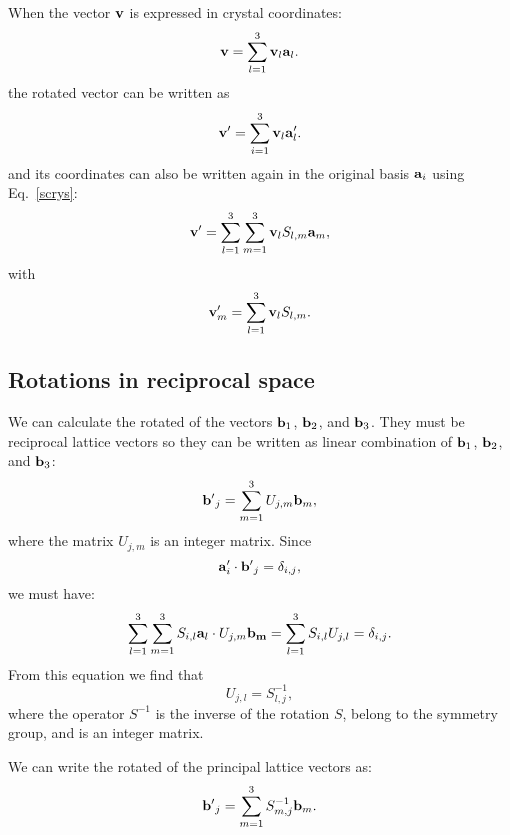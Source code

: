 \documentclass[12pt,a4paper,twoside]{report}
\begin{document}
When the vector ${\bf v}$ is expressed in crystal coordinates:
\begin{equation}
{\bf v} = \sum_{l=1}^3 {\bf v}_l {\bf a}_l.
\end{equation}
the rotated vector can be written as
\begin{equation}
{\bf v}' = \sum_{i=1}^3 {\bf v}_l {\bf a}'_l.
\end{equation}
and its coordinates can also be written again in the original basis
${\bf a}_i$ using Eq.~\ref{scrys}:
\begin{equation}
{\bf v}' = \sum_{l=1}^3 \sum_{m=1}^3 {\bf v}_l S_{l,m} {\bf a}_m,
\end{equation}
with
\begin{equation}
{\bf v}'_m = \sum_{l=1}^3 {\bf v}_l S_{l,m}.
\label{rotvcry}
\end{equation}

\subsection{Rotations in reciprocal space}

We can calculate the rotated of the vectors
${\bf b}_1$, ${\bf b}_2$,
and ${\bf b}_3$. They must be reciprocal lattice vectors so they can be written as linear combination
of ${\bf b}_1$, ${\bf b}_2$,
and ${\bf b}_3$:
\begin{equation}
{\bf b'}_j = \sum_{m=1}^3 U_{j,m} {\bf b}_m,
\end{equation}
where the matrix $U_{j,m}$ is an integer matrix.
Since
\begin{equation}
{\bf a}'_i \cdot {\bf b'}_j = \delta_{i,j},
\end{equation}
we must have:
\begin{equation}
\sum_{l=1}^3 \sum_{m=1}^3 S_{i,l} {\bf a}_l \cdot U_{j,m} {\bf b_m} =  \sum_{l=1}^3 S_{i,l} U_{j,l} =
\delta_{i,j}.
\end{equation}
From this equation we find that
\begin{equation}
U_{j,l} = S^{-1}_{l,j},
\end{equation}
where the operator $S^{-1}$ is the inverse of the rotation $S$, belong to the symmetry group, and is an integer matrix.

We can write the rotated of the principal lattice vectors as:
\begin{equation}
{\bf b'}_j = \sum_{m=1}^3 S^{-1}_{m,j} {\bf b}_m.
\end{equation}
\end{document}
